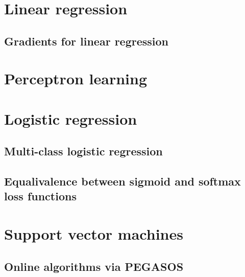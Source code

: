 \documentclass[12pt]{article}
\begin{document}
\section{Linear regression}
\subsection{Gradients for linear regression}

\section{Perceptron learning}

\section{Logistic regression}

\subsection{Multi-class logistic regression}

\subsection{Equalivalence between sigmoid and softmax loss functions}

\section{Support vector machines}
\subsection{Online algorithms via PEGASOS}
\end{document}
